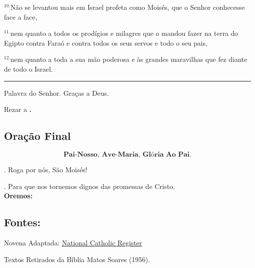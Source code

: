 \documentclass[a4paper,14pt]{extarticle} \usepackage[utf8]{inputenc}
\makeatletter
\newcommand{\vers@resp@sym}{%
  \raisebox{0.2ex}{\rotatebox[origin=c]{-20}{$\m@th\rceil$}}%
}
\newcommand{\vers@resp}[2]{%
  {\ooalign{%
     \hidewidth\kern#1\vers@resp@sym\hidewidth\cr
     #2\cr
  }}%
}
\DeclareRobustCommand{\versicle}{\vers@resp{-0.1em}{V}}
\DeclareRobustCommand{\response}{\vers@resp{0pt}{R}}
\makeatother
\begin{document}
$^{10.}$Não se levantou mais em Israel profeta como Moisés, que o Senhor conhecesse face a face,

$^{11.}$nem quanto a todos os prodígios e milagres que o mandou fazer na terra do Egipto contra Faraó e contra todos os seus servos e todo o seu pais,

$^{12.}$nem quanto a toda a sua mão poderosa e às grandes maravilhas que fez diante de todo o Israel.


\par\noindent\rule{\textwidth}{0.4pt}

Palavra do Senhor. Graças a Deus.

Rezar a \textbf{.}


\subsection{Oração Final} \label{oracao-final}

\[
  \textbf{Pai-Nosso, Ave-Maria, Glória Ao Pai.}
\]

\response. \quad Roga por nós, São Moisés!

\versicle. \quad Para que nos tornemos dignos das promessas de Cristo. \\


\textbf{Oremos:} 


\vfill

\begin{center}
\subsection*{Fontes:}
Novena Adaptada: \underline{\href{https://www.ncregister.com/blog/sept-4-is-the-feast-of-moses-the-lawgiver}{National Catholic Register}}

Textos Retirados da Bíblia Matos Soares (1956).
\end{center}
\end{document}
